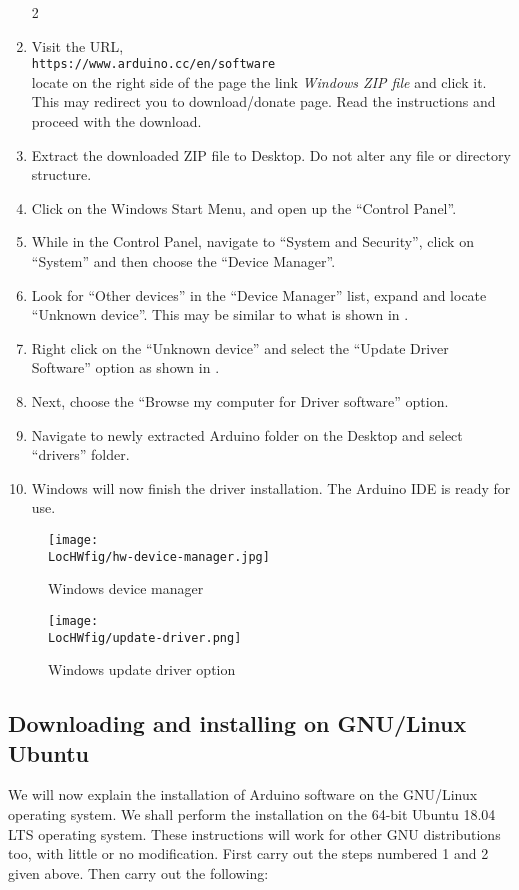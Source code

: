 \begin{enumerate}
      \setcounter{enumi}2
      \item Visit the URL, \\{\tt https://www.arduino.cc/en/software} \\
            locate on the right side of the page the link \emph{Windows ZIP file} and click it.  
            This may redirect you to download/donate page. Read the instructions and proceed with the
            download.
      \item Extract the downloaded ZIP file to Desktop. Do not alter any
            file or directory structure.
      \item Click on the Windows Start Menu, and open up the ``Control
            Panel''.
      \item While in the Control Panel, navigate to ``System and Security'',
            click on ``System'' and then choose the ``Device Manager''.
      \item Look for ``Other devices'' in the ``Device Manager'' list,
            expand and locate ``Unknown device''.  This may be similar to what
            is shown in .
      \item Right click on the ``Unknown device'' and select the ``Update
            Driver Software'' option as shown in .
      \item Next, choose the ``Browse my computer for Driver software''
            option.
      \item Navigate to newly extracted Arduino folder on the Desktop and
            select ``drivers'' folder.
      \item Windows will now finish the driver installation. The Arduino IDE
            is ready for use.
\end{enumerate}

\begin{figure}
      \centering
      \texttt{[image: \\LocHWfig/hw-device-manager.jpg]}
      \caption{Windows device manager}
      \label{win-device-manager}
\end{figure}

\begin{figure}
      \centering
      \texttt{[image: \\LocHWfig/update-driver.png]}
      \caption{Windows update driver option}
      \label{win-dri-update}
\end{figure}


\subsection{Downloading and installing on GNU/Linux Ubuntu}
We will now explain the installation of Arduino software on the
GNU/Linux operating system. We shall perform the installation on the 64-bit 
Ubuntu 18.04 LTS operating system.  These
instructions will work for other GNU distributions too, with little or
no modification.  First carry out the steps numbered 1 and 2 given
above.  Then carry out the following:

